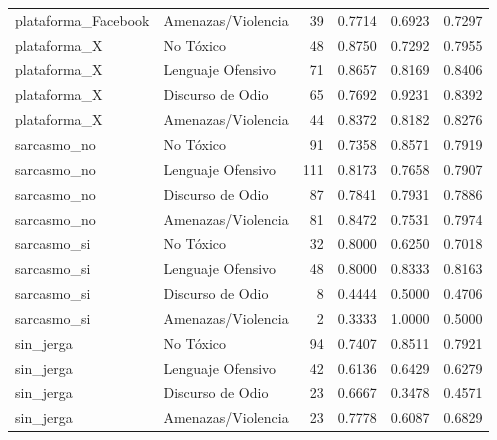 \begin{tabular}{llrrrr}
plataforma\_Facebook & Amenazas/Violencia & 39 & 0.7714 & 0.6923 & 0.7297 \\
plataforma\_X & No Tóxico & 48 & 0.8750 & 0.7292 & 0.7955 \\
plataforma\_X & Lenguaje Ofensivo & 71 & 0.8657 & 0.8169 & 0.8406 \\
plataforma\_X & Discurso de Odio & 65 & 0.7692 & 0.9231 & 0.8392 \\
plataforma\_X & Amenazas/Violencia & 44 & 0.8372 & 0.8182 & 0.8276 \\
sarcasmo\_no & No Tóxico & 91 & 0.7358 & 0.8571 & 0.7919 \\
sarcasmo\_no & Lenguaje Ofensivo & 111 & 0.8173 & 0.7658 & 0.7907 \\
sarcasmo\_no & Discurso de Odio & 87 & 0.7841 & 0.7931 & 0.7886 \\
sarcasmo\_no & Amenazas/Violencia & 81 & 0.8472 & 0.7531 & 0.7974 \\
sarcasmo\_si & No Tóxico & 32 & 0.8000 & 0.6250 & 0.7018 \\
sarcasmo\_si & Lenguaje Ofensivo & 48 & 0.8000 & 0.8333 & 0.8163 \\
sarcasmo\_si & Discurso de Odio & 8 & 0.4444 & 0.5000 & 0.4706 \\
sarcasmo\_si & Amenazas/Violencia & 2 & 0.3333 & 1.0000 & 0.5000 \\
sin\_jerga & No Tóxico & 94 & 0.7407 & 0.8511 & 0.7921 \\
sin\_jerga & Lenguaje Ofensivo & 42 & 0.6136 & 0.6429 & 0.6279 \\
sin\_jerga & Discurso de Odio & 23 & 0.6667 & 0.3478 & 0.4571 \\
sin\_jerga & Amenazas/Violencia & 23 & 0.7778 & 0.6087 & 0.6829 \\
\bottomrule
\end{tabular}
